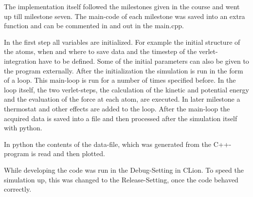 The implementation itself followed the milestones given in the course and went up till milestone seven. 
The main-code of each milestone was saved into an extra function and can be commented in and out in the main.cpp.


\par 
In the first step all variables are initialized. For example the initial structure of the atoms, when and where to save data and the timestep of the verlet-integration have to be defined. Some of the initial parameters can also be given to the program externally. After the initialization the simulation is run in the form of a loop. This main-loop is run for a number of times specified before. In the loop itself, the two verlet-steps, the calculation of the kinetic and potential energy and the evaluation of the force at each atom, are executed. In later milestone a thermostat and other effects are added to the loop. 
After the main-loop the acquired data is saved into a file and then processed after the simulation itself with python. 

\par 
In python the contents of the data-file, which was generated from the C++-program is read and then plotted. 

\par 
While developing the code was run in the Debug-Setting in CLion. To speed the simulation up, this was changed to the Release-Setting, once the code behaved correctly.



